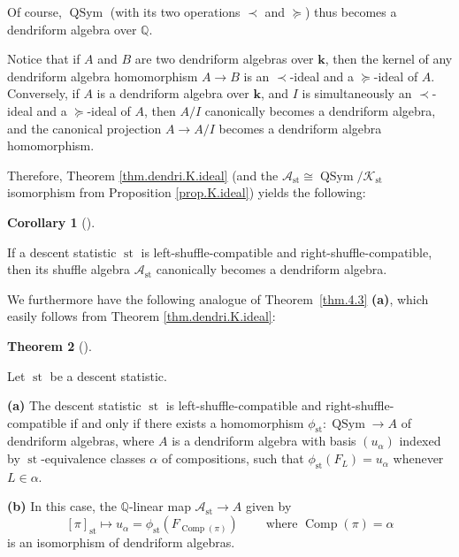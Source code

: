 \documentclass[numbers=enddot,12pt,final,onecolumn,notitlepage]{scrartcl}%
\theoremstyle{definition}
\newtheorem{theo}{Theorem}[section]
\newenvironment{theorem}[1][]
{\begin{theo}[#1]\begin{leftbar}}
{\end{leftbar}\end{theo}}
\newtheorem{coro}[theo]{Corollary}
\newenvironment{corollary}[1][]
{\begin{coro}[#1]\begin{leftbar}}
{\end{leftbar}\end{coro}}
\begin{document}
Of course, $\operatorname*{QSym}$ (with its two operations $\left.
\prec\right.  $ and $\left.  \succeq\right.  $) thus becomes a dendriform
algebra over $\mathbb{Q}$.

Notice that if $A$ and $B$ are two dendriform algebras over $\mathbf{k}$, then
the kernel of any dendriform algebra homomorphism $A\rightarrow B$ is an
$\left.  \prec\right.  $-ideal and a $\left.  \succeq\right.  $-ideal of $A$.
Conversely, if $A$ is a dendriform algebra over $\mathbf{k}$, and $I$ is
simultaneously an $\left.  \prec\right.  $-ideal and a $\left.  \succeq
\right.  $-ideal of $A$, then $A/I$ canonically becomes a dendriform algebra,
and the canonical projection $A\rightarrow A/I$ becomes a dendriform algebra homomorphism.

Therefore, Theorem \ref{thm.dendri.K.ideal} (and the $\mathcal{A}%
_{\operatorname*{st}}\cong\operatorname*{QSym}/\mathcal{K}_{\operatorname*{st}%
}$ isomorphism from Proposition \ref{prop.K.ideal}) yields the following:

\begin{corollary}
\label{cor.dendri.quotient-dendri}If a descent statistic $\operatorname*{st}$
is left-shuffle-compatible and right-shuffle-compatible, then its shuffle
algebra $\mathcal{A}_{\operatorname*{st}}$ canonically becomes a dendriform algebra.
\end{corollary}

We furthermore have the following analogue of Theorem~\ref{thm.4.3}
\textbf{(a)}, which easily follows from Theorem \ref{thm.dendri.K.ideal}:

\begin{theorem}
\label{thm.dendri.4.3}Let $\operatorname*{st}$ be a descent statistic.

\textbf{(a)} The descent statistic $\operatorname*{st}$ is
left-shuffle-compatible and right-shuffle-compatible if and only if there
exists a homomorphism $\phi_{\operatorname*{st}}:\operatorname*{QSym}%
\rightarrow A$ of dendriform algebras, where $A$ is a dendriform algebra with
basis $\left(  u_{\alpha}\right)  $ indexed by $\operatorname*{st}%
$-equivalence classes $\alpha$ of compositions, such that $\phi
_{\operatorname*{st}}\left(  F_{L}\right)  =u_{\alpha}$ whenever $L\in\alpha$.

\textbf{(b)} In this case, the $\mathbb{Q}$-linear map $\mathcal{A}%
_{\operatorname*{st}}\rightarrow A$ given by%
\[
\left[  \pi\right]  _{\operatorname*{st}}\mapsto u_{\alpha}=\phi
_{\operatorname*{st}}\left(  F_{\operatorname*{Comp}\left(  \pi\right)
}\right)  \ \ \ \ \ \ \ \ \ \ \text{where }\operatorname*{Comp}\left(
\pi\right)  =\alpha
\]
is an isomorphism of dendriform algebras.
\end{theorem}
\end{document}

